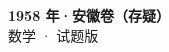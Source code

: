 \documentclass[zihao=-4, a4paper]{ctexart}
\begin{document}
\begin{center}
  {\Large\bfseries 1958 年·安徽卷（存疑）}\\[4pt]
  {\large 数学 · 试题版}
\end{center}
\medskip
{}

\end{document}

